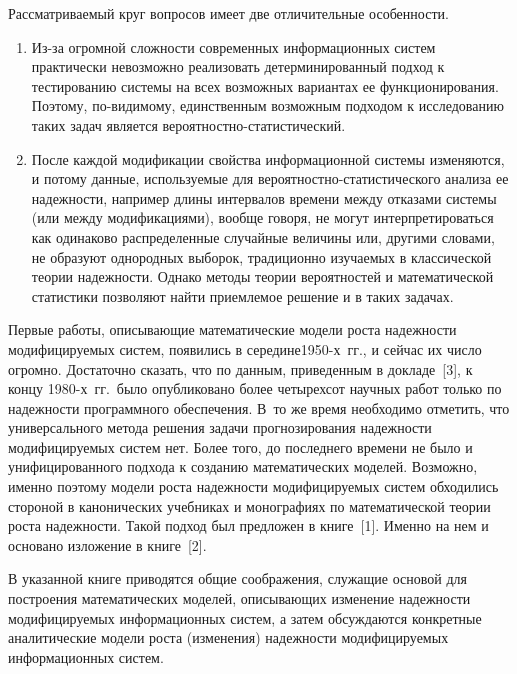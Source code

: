 \begin{multicols}{2}
Рассматриваемый круг вопросов имеет две отличительные особенности.
\begin{enumerate}[1.]
\item Из-за огромной сложности современных информационных сис\-тем
практически невозможно реализовать детерминированный подход к
тестированию системы на всех возможных вариан\-тах ее
функционирования. Поэтому, по-ви\-ди\-мо\-му, единственным возможным
подходом к исследованию таких задач является
ве\-ро\-ят\-но\-ст\-но-ста\-ти\-сти\-ческий.
\item
После каждой модификации свойства информационной системы
изменяются, и потому данные, используемые для
ве\-ро\-ят\-но\-ст\-но-ста\-ти\-сти\-че\-ско\-го анализа ее надежности, например \mbox{длины}
интервалов времени между отказами сис\-те\-мы (или между модификациями),
вообще говоря, не могут интерпретироваться как одинаково
распределенные случайные величины или, другими словами, не образуют
однородных выборок, традиционно изучаемых в классической теории
надежности. Однако методы теории вероятностей и математической
статистики позволяют найти приемлемое решение и в таких задачах.
\end{enumerate}

Первые работы, описывающие математические модели роста надежности
модифицируемых сис\-тем, появились в середине1950-х~гг., и
сейчас их чис\-ло огромно. Достаточно сказать, что по данным,
приведенным в докладе~[3], к концу 1980-х~гг.\ было
опубликовано более четырехсот научных работ только по надежности
программного обеспечения. В~то же время необходимо отметить, что
универсального метода решения задачи прогнозирования надежности
модифицируемых сис\-тем нет. Более того, до последнего времени не было
и унифицированного подхода к созданию математических моделей.
Возможно, именно поэтому модели роста надежности модифицируемых
систем обходились стороной в канонических учебниках и монографиях по
математической теории роста надежности. Такой подход был предложен в
книге~[1]. Именно на нем и основано изложение в книге~[2].

В указанной книге приводятся общие соображения, служащие основой для
построения математических моделей, описывающих изменение надежности
модифицируемых информационных систем, а затем обсуждаются конкретные
аналитические модели роста (изменения) надежности модифицируемых
информационных систем.


\end{multicols}

